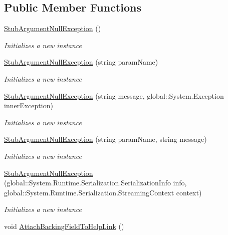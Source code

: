 \subsection*{Public Member Functions}
\begin{DoxyCompactItemize}
\item 
\hyperlink{class_system_1_1_fakes_1_1_stub_argument_null_exception_a870b530caf4c25f0b58da1e70ae628ab}{Stub\-Argument\-Null\-Exception} ()
\begin{DoxyCompactList}\small\item\em Initializes a new instance\end{DoxyCompactList}\item 
\hyperlink{class_system_1_1_fakes_1_1_stub_argument_null_exception_a801c05c1239d6a8d79a94927af5b7c9f}{Stub\-Argument\-Null\-Exception} (string param\-Name)
\begin{DoxyCompactList}\small\item\em Initializes a new instance\end{DoxyCompactList}\item 
\hyperlink{class_system_1_1_fakes_1_1_stub_argument_null_exception_a118e3e5ec497167c5e231c2626e76f89}{Stub\-Argument\-Null\-Exception} (string message, global\-::\-System.\-Exception inner\-Exception)
\begin{DoxyCompactList}\small\item\em Initializes a new instance\end{DoxyCompactList}\item 
\hyperlink{class_system_1_1_fakes_1_1_stub_argument_null_exception_af5adf1c60307a69d235ee62d1c89b848}{Stub\-Argument\-Null\-Exception} (string param\-Name, string message)
\begin{DoxyCompactList}\small\item\em Initializes a new instance\end{DoxyCompactList}\item 
\hyperlink{class_system_1_1_fakes_1_1_stub_argument_null_exception_a242a2eb830c233cc29ac69f3ee6294d7}{Stub\-Argument\-Null\-Exception} (global\-::\-System.\-Runtime.\-Serialization.\-Serialization\-Info info, global\-::\-System.\-Runtime.\-Serialization.\-Streaming\-Context context)
\begin{DoxyCompactList}\small\item\em Initializes a new instance\end{DoxyCompactList}\item 
void \hyperlink{class_system_1_1_fakes_1_1_stub_argument_null_exception_a9b645e311f3e8bd44646dba8f697aa99}{Attach\-Backing\-Field\-To\-Help\-Link} ()

\end{DoxyCompactItemize}
